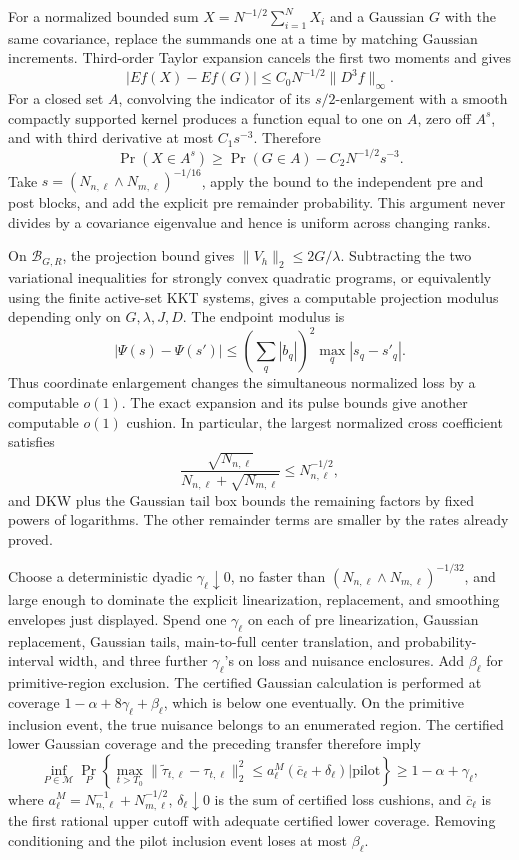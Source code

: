 For a normalized bounded sum \(X=N^{-1/2}\sum_{i=1}^NX_i\) and a Gaussian \(G\) with the same covariance, replace the summands one at a time by matching Gaussian increments.  Third-order Taylor expansion cancels the first two moments and gives
\[
 |Ef(X)-Ef(G)|\leq C_0N^{-1/2}\|D^3f\|_\infty.
\]
For a closed set \(A\), convolving the indicator of its \(s/2\)-enlargement with a smooth compactly supported kernel produces a function equal to one on \(A\), zero off \(A^s\), and with third derivative at most \(C_1s^{-3}\).  Therefore
\[
 \Pr(X\in A^s)\geq\Pr(G\in A)-C_2N^{-1/2}s^{-3}.
\]
Take \(s=(N_{n,\ell}\wedge N_{m,\ell})^{-1/16}\), apply the bound to the independent pre and post blocks, and add the explicit pre remainder probability.  This argument never divides by a covariance eigenvalue and hence is uniform across changing ranks.

On \(\mathcal B_{G,R}\), the projection bound gives \(\|V_h\|_2\leq2G/\lambda\).  Subtracting the two variational inequalities for strongly convex quadratic programs, or equivalently using the finite active-set KKT systems, gives a computable projection modulus depending only on \(G,\lambda,J,D\).  The endpoint modulus is
\[
 |\Psi(s)-\Psi(s')|
 \leq\left(\sum_q|b_q|\right)^2\max_q|s_q-s'_q|.
\]
Thus coordinate enlargement changes the simultaneous normalized loss by a computable \(o(1)\).  The exact expansion and its pulse bounds give another computable \(o(1)\) cushion.  In particular, the largest normalized cross coefficient satisfies
\[
 \frac{\sqrt{N_{n,\ell}}}{N_{n,\ell}+\sqrt{N_{m,\ell}}}
 \leq N_{n,\ell}^{-1/2},
\]
and DKW plus the Gaussian tail box bounds the remaining factors by fixed powers of logarithms.  The other remainder terms are smaller by the rates already proved.

Choose a deterministic dyadic \(\gamma_\ell\downarrow0\), no faster than
\((N_{n,\ell}\wedge N_{m,\ell})^{-1/32}\), and large enough to dominate the explicit linearization, replacement, and smoothing envelopes just displayed.  Spend one \(\gamma_\ell\) on each of pre linearization, Gaussian replacement, Gaussian tails, main-to-full center translation, and probability-interval width, and three further \(\gamma_\ell\)'s on loss and nuisance enclosures.  Add \(\beta_\ell\) for primitive-region exclusion.  The certified Gaussian calculation is performed at coverage
\(1-\alpha+8\gamma_\ell+\beta_\ell\), which is below one eventually.  On the primitive inclusion event, the true nuisance belongs to an enumerated region.  The certified lower Gaussian coverage and the preceding transfer therefore imply
\[
 \inf_{P\in\mathcal M}
 \Pr_P\left\{
 \max_{t>T_0}\|\widetilde\tau_{t,\ell}-\tau_{t,\ell}\|_2^2
 \leq a^M_\ell(\overline c_\ell+\delta_\ell)
 \mathrel{\big|}\text{pilot}\right\}
 \geq1-\alpha+\gamma_\ell,
\]
where \(a^M_\ell=N_{n,\ell}^{-1}+N_{m,\ell}^{-1/2}\),
\(\delta_\ell\downarrow0\) is the sum of certified loss cushions, and
\(\overline c_\ell\) is the first rational upper cutoff with adequate certified lower coverage.  Removing conditioning and the pilot inclusion event loses at most \(\beta_\ell\).

